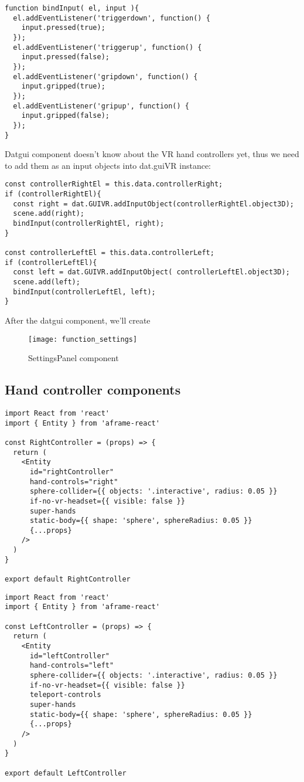 \begin{lstlisting}
function bindInput( el, input ){
  el.addEventListener('triggerdown', function() {
    input.pressed(true);
  });
  el.addEventListener('triggerup', function() {
    input.pressed(false);
  });
  el.addEventListener('gripdown', function() {
    input.gripped(true);
  });
  el.addEventListener('gripup', function() {
    input.gripped(false);
  });
}
\end{lstlisting}

Datgui component doesn't know about the VR hand controllers yet, thus we need to add them as an input objects into dat.guiVR instance:


\begin{lstlisting}
const controllerRightEl = this.data.controllerRight;
if (controllerRightEl){
  const right = dat.GUIVR.addInputObject(controllerRightEl.object3D);
  scene.add(right);
  bindInput(controllerRightEl, right);
}

const controllerLeftEl = this.data.controllerLeft;
if (controllerLeftEl){
  const left = dat.GUIVR.addInputObject( controllerLeftEl.object3D);
  scene.add(left);
  bindInput(controllerLeftEl, left);
}
\end{lstlisting}

After the datgui component, we'll create 

\begin{figure}[ht!]
\centering
\texttt{[image: function\_settings]}
\caption{SettingsPanel component}
\label{r:4}
\end{figure}

\subsection{Hand controller components}


\begin{lstlisting}
import React from 'react'
import { Entity } from 'aframe-react'

const RightController = (props) => {
  return (
    <Entity
      id="rightController"
      hand-controls="right"
      sphere-collider={{ objects: '.interactive', radius: 0.05 }}
      if-no-vr-headset={{ visible: false }}
      super-hands
      static-body={{ shape: 'sphere', sphereRadius: 0.05 }}
      {...props}
    />
  )
}

export default RightController
\end{lstlisting}


\begin{lstlisting}
import React from 'react'
import { Entity } from 'aframe-react'

const LeftController = (props) => {
  return (
    <Entity
      id="leftController"
      hand-controls="left"
      sphere-collider={{ objects: '.interactive', radius: 0.05 }}
      if-no-vr-headset={{ visible: false }}
      teleport-controls
      super-hands
      static-body={{ shape: 'sphere', sphereRadius: 0.05 }}
      {...props}
    />
  )
}

export default LeftController
\end{lstlisting}

